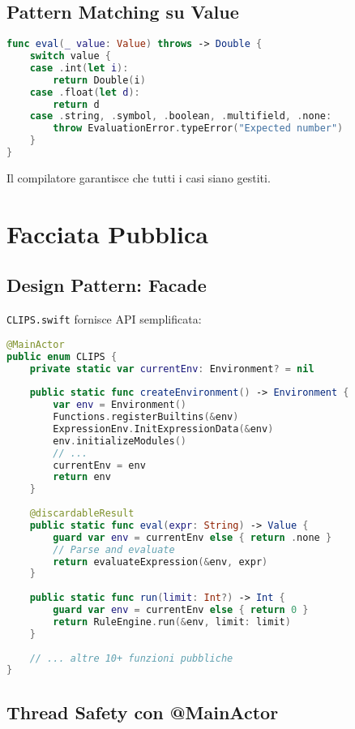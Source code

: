 \subsection{Pattern Matching su Value}

\begin{lstlisting}[language=Swift]
func eval(_ value: Value) throws -> Double {
    switch value {
    case .int(let i):
        return Double(i)
    case .float(let d):
        return d
    case .string, .symbol, .boolean, .multifield, .none:
        throw EvaluationError.typeError("Expected number")
    }
}
\end{lstlisting}

Il compilatore garantisce che tutti i casi siano gestiti.

\section{Facciata Pubblica}

\subsection{Design Pattern: Facade}

\texttt{CLIPS.swift} fornisce API semplificata:

\begin{lstlisting}[language=Swift]
@MainActor
public enum CLIPS {
    private static var currentEnv: Environment? = nil
    
    public static func createEnvironment() -> Environment {
        var env = Environment()
        Functions.registerBuiltins(&env)
        ExpressionEnv.InitExpressionData(&env)
        env.initializeModules()
        // ...
        currentEnv = env
        return env
    }
    
    @discardableResult
    public static func eval(expr: String) -> Value {
        guard var env = currentEnv else { return .none }
        // Parse and evaluate
        return evaluateExpression(&env, expr)
    }
    
    public static func run(limit: Int?) -> Int {
        guard var env = currentEnv else { return 0 }
        return RuleEngine.run(&env, limit: limit)
    }
    
    // ... altre 10+ funzioni pubbliche
}
\end{lstlisting}

\subsection{Thread Safety con @MainActor}

